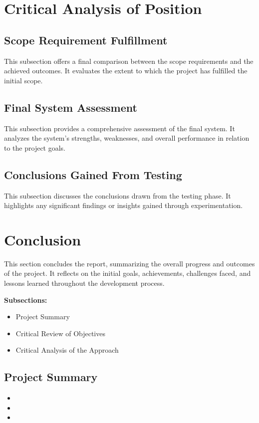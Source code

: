 \documentclass{UoNMCHA}
\numberwithin{equation}{section}
\begin{document}
\section{Critical Analysis of Position}\label{sec:Critical Analysis of Position}
\subsection{Scope Requirement Fulfillment}\label{sub:Scope Requirement Fulfillment}
This subsection offers a final comparison between the scope requirements and the achieved outcomes. It evaluates the extent to which the project has fulfilled the initial scope.

\subsection{Final System Assessment}\label{sub:Final System Assessment}
This subsection provides a comprehensive assessment of the final system. It analyzes the system's strengths, weaknesses, and overall performance in relation to the project goals.

\subsection{Conclusions Gained From Testing}\label{sub:Conclusions Gained From Testing}
This subsection discusses the conclusions drawn from the testing phase. It highlights any significant findings or insights gained through experimentation.\\
\newpage
\section{Conclusion}\label{sec:Conclusion}
This section concludes the report, summarizing the overall progress and outcomes of the project. It reflects on the initial goals, achievements, challenges faced, and lessons learned throughout the development process.

\textbf{Subsections:}\\
\begin{itemize}
	\item Project Summary
	\item Critical Review of Objectives
	\item Critical Analysis of the Approach
\end{itemize}

\subsection{Project Summary}\label{sub:Project Summary}
\begin{itemize}
	\item 
	\item 
	\item 
\end{itemize}
\end{document}
